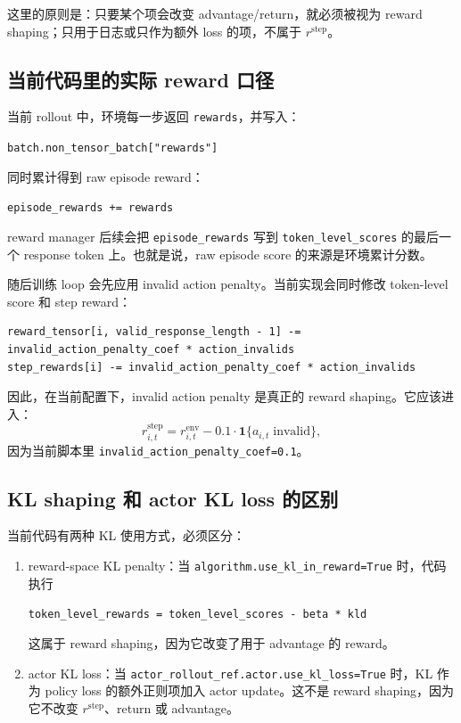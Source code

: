 \documentclass[10pt]{ctexart}
\newcommand{\code}[1]{\texttt{#1}}
\begin{document}
这里的原则是：只要某个项会改变 advantage/return，就必须被视为 reward shaping；只用于日志或只作为额外 loss 的项，不属于 \(r^{\mathrm{step}}\)。

\subsection*{当前代码里的实际 reward 口径}
当前 rollout 中，环境每一步返回 \code{rewards}，并写入：
\begin{center}
\code{batch.non\_tensor\_batch["rewards"]}
\end{center}
同时累计得到 raw episode reward：
\begin{center}
\code{episode\_rewards += rewards}
\end{center}
reward manager 后续会把 \code{episode\_rewards} 写到 \code{token\_level\_scores} 的最后一个 response token 上。也就是说，raw episode score 的来源是环境累计分数。

随后训练 loop 会先应用 invalid action penalty。当前实现会同时修改 token-level score 和 step reward：
\begin{Verbatim}[breaklines=true,breakanywhere=true]
reward_tensor[i, valid_response_length - 1] -= invalid_action_penalty_coef * action_invalids
step_rewards[i] -= invalid_action_penalty_coef * action_invalids
\end{Verbatim}
因此，在当前配置下，invalid action penalty 是真正的 reward shaping。它应该进入：
\[
r^{\mathrm{step}}_{i,t}
= r^{\mathrm{env}}_{i,t}-0.1\cdot\mathbf{1}\{a_{i,t}\;\text{invalid}\},
\]
因为当前脚本里 \code{invalid\_action\_penalty\_coef=0.1}。

\subsection*{KL shaping 和 actor KL loss 的区别}
当前代码有两种 KL 使用方式，必须区分：
\begin{enumerate}
  \item reward-space KL penalty：当 \code{algorithm.use\_kl\_in\_reward=True} 时，代码执行
  \begin{center}
  \code{token\_level\_rewards = token\_level\_scores - beta * kld}
  \end{center}
  这属于 reward shaping，因为它改变了用于 advantage 的 reward。
  \item actor KL loss：当 \code{actor\_rollout\_ref.actor.use\_kl\_loss=True} 时，KL 作为 policy loss 的额外正则项加入 actor update。这不是 reward shaping，因为它不改变 \(r^{\mathrm{step}}\)、return 或 advantage。
\end{enumerate}
\end{document}
